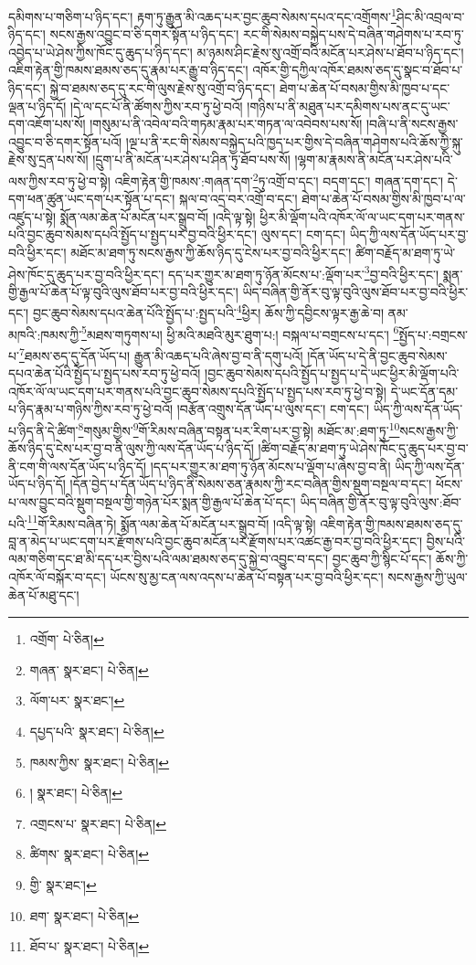 དམིགས་པ་གཅིག་པ་ཉིད་དང་། རྟག་ཏུ་རྒྱུན་མི་འཆད་པར་བྱང་ཆུབ་སེམས་དཔའ་དང་འགྲོགས་\footnote{འགྲོག་  པེ་ཅིན། }ཤིང་མི་འབྲལ་བ་ཉིད་དང་། སངས་རྒྱས་འབྱུང་བ་ཅི་དགར་སྟོན་པ་ཉིད་དང་། རང་གི་སེམས་བསྐྱེད་པས་དེ་བཞིན་གཤེགས་པ་རབ་ཏུ་འབྱེད་པ་ཡེ་ཤེས་ཀྱིས་ཁོང་དུ་ཆུད་པ་ཉིད་དང་། མ་ཉམས་ཤིང་རྗེས་སུ་འགྲོ་བའི་མངོན་པར་ཤེས་པ་ཐོབ་པ་ཉིད་དང་། འཇིག་རྟེན་གྱི་ཁམས་ཐམས་ཅད་དུ་རྣམ་པར་རྒྱུ་བ་ཉིད་དང་། འཁོར་གྱི་དཀྱིལ་འཁོར་ཐམས་ཅད་དུ་སྣང་བ་ཐོབ་པ་ཉིད་དང་། སྐྱེ་བ་ཐམས་ཅད་དུ་རང་གི་ལུས་རྗེས་སུ་འགྲོ་བ་ཉིད་དང་། ཐེག་པ་ཆེན་པོ་བསམ་གྱིས་མི་ཁྱབ་པ་དང་ལྡན་པ་ཉིད་དོ། །དེ་ལ་དང་པོ་ནི་ཚོགས་ཀྱིས་རབ་ཏུ་ཕྱེ་བའོ། །གཉིས་པ་ནི་མཐུན་པར་དམིགས་པས་ནང་དུ་ཡང་དག་འཇོག་པས་སོ། །གསུམ་པ་ནི་འབེལ་བའི་གཏམ་རྣམ་པར་གཏན་ལ་འབེབས་པས་སོ། །བཞི་པ་ནི་སངས་རྒྱས་འབྱུང་བ་ཅི་དགར་སྟོན་པའོ། །ལྔ་པ་ནི་རང་གི་སེམས་བསྐྱེད་པའི་ཁྱད་པར་གྱིས་དེ་བཞིན་གཤེགས་པའི་ཆོས་ཀྱི་སྐུ་རྗེས་སུ་དྲན་པས་སོ། །དྲུག་པ་ནི་མངོན་པར་ཤེས་པ་ཤིན་ཏུ་ཐོབ་པས་སོ། །ལྷག་མ་རྣམས་ནི་མངོན་པར་ཤེས་པའི་ལས་ཀྱིས་རབ་ཏུ་ཕྱེ་བ་སྟེ། འཇིག་རྟེན་གྱི་ཁམས་:གཞན་དག་\footnote{གཞན་  སྣར་ཐང་།  པེ་ཅིན། }ཏུ་འགྲོ་བ་དང་། བདག་དང་། གཞན་དག་དང་། དེ་དག་ཕན་ཚུན་ཡང་དག་པར་སྟོན་པ་དང་། སྐལ་བ་འདྲ་བར་འགྲོ་བ་དང་། ཐེག་པ་ཆེན་པོ་བསམ་གྱིས་མི་ཁྱབ་པ་ལ་འཛུད་པ་སྟེ། སྨོན་ལམ་ཆེན་པོ་མངོན་པར་སྒྲུབ་བོ། །འདི་ལྟ་སྟེ། ཕྱིར་མི་ལྡོག་པའི་འཁོར་ལོ་ལ་ཡང་དག་པར་གནས་པའི་བྱང་ཆུབ་སེམས་དཔའི་སྤྱོད་པ་སྤྱད་པར་བྱ་བའི་ཕྱིར་དང་། ལུས་དང་། ངག་དང་། ཡིད་ཀྱི་ལས་དོན་ཡོད་པར་བྱ་བའི་ཕྱིར་དང་། མཐོང་མ་ཐག་ཏུ་སངས་རྒྱས་ཀྱི་ཆོས་ཉིད་དུ་ངེས་པར་བྱ་བའི་ཕྱིར་དང་། ཚིག་བརྗོད་མ་ཐག་ཏུ་ཡེ་ཤེས་ཁོང་དུ་ཆུད་པར་བྱ་བའི་ཕྱིར་དང་། དད་པར་གྱུར་མ་ཐག་ཏུ་ཉོན་མོངས་པ་:ལྡོག་པར་\footnote{ལོག་པར་  སྣར་ཐང་། }བྱ་བའི་ཕྱིར་དང་། སྨན་གྱི་རྒྱལ་པོ་ཆེན་པོ་ལྟ་བུའི་ལུས་ཐོབ་པར་བྱ་བའི་ཕྱིར་དང་། ཡིད་བཞིན་གྱི་ནོར་བུ་ལྟ་བུའི་ལུས་ཐོབ་པར་བྱ་བའི་ཕྱིར་དང་། བྱང་ཆུབ་སེམས་དཔའ་ཆེན་པོའི་སྤྱོད་པ་:སྤྱད་པའི་\footnote{དཔྱད་པའི་  སྣར་ཐང་།  པེ་ཅིན། }ཕྱིར། ཆོས་ཀྱི་དབྱིངས་ལྟར་རྒྱ་ཆེ་བ། ནམ་མཁའི་:ཁམས་ཀྱི་\footnote{ཁམས་ཀྱིས་  སྣར་ཐང་།  པེ་ཅིན། }མཐས་གཏུགས་པ། ཕྱི་མའི་མཐའི་མུར་ཐུག་པ:། བསྐལ་པ་བགྲངས་པ་དང་། \footnote{།    སྣར་ཐང་།  པེ་ཅིན། }སྤྱོད་པ་:བགྲངས་པ་\footnote{འགྲངས་པ་  སྣར་ཐང་།  པེ་ཅིན། }ཐམས་ཅད་དུ་དོན་ཡོད་པ། རྒྱུན་མི་འཆད་པའི་ཞེས་བྱ་བ་ནི་དགུ་པའོ། །དོན་ཡོད་པ་དེ་ནི་བྱང་ཆུབ་སེམས་དཔའ་ཆེན་པོའི་སྤྱོད་པ་སྤྱད་པས་རབ་ཏུ་ཕྱེ་བའོ། །བྱང་ཆུབ་སེམས་དཔའི་སྤྱོད་པ་སྤྱད་པ་དེ་ཡང་ཕྱིར་མི་ལྡོག་པའི་འཁོར་ལོ་ལ་ཡང་དག་པར་གནས་པའི་བྱང་ཆུབ་སེམས་དཔའི་སྤྱོད་པ་སྤྱད་པས་རབ་ཏུ་ཕྱེ་བ་སྟེ། དེ་ཡང་དོན་དམ་པ་ཉིད་རྣམ་པ་གཉིས་ཀྱིས་རབ་ཏུ་ཕྱེ་བའོ། །བརྩོན་འགྲུས་དོན་ཡོད་པ་ལུས་དང་། ངག་དང་། ཡིད་ཀྱི་ལས་དོན་ཡོད་པ་ཉིད་ནི་དེ་ཚིག་\footnote{ཚིགས་  སྣར་ཐང་།  པེ་ཅིན། }གསུམ་གྱིས་\footnote{གྱི་  སྣར་ཐང་། }གོ་རིམས་བཞིན་བསྟན་པར་རིག་པར་བྱ་སྟེ། མཐོང་མ་:ཐག་ཏུ་\footnote{ཐག་  སྣར་ཐང་།  པེ་ཅིན། }སངས་རྒྱས་ཀྱི་ཆོས་ཉིད་དུ་ངེས་པར་བྱ་བ་ནི་ལུས་ཀྱི་ལས་དོན་ཡོད་པ་ཉིད་དོ། །ཚིག་བརྗོད་མ་ཐག་ཏུ་ཡེ་ཤེས་ཁོང་དུ་ཆུད་པར་བྱ་བ་ནི་ངག་གི་ལས་དོན་ཡོད་པ་ཉིད་དོ། །དད་པར་གྱུར་མ་ཐག་ཏུ་ཉོན་མོངས་པ་ལྡོག་པ་ཞེས་བྱ་བ་ནི། ཡིད་ཀྱི་ལས་དོན་ཡོད་པ་ཉིད་དོ། །དོན་བྱེད་པ་དོན་ཡོད་པ་ཉིད་ནི་སེམས་ཅན་རྣམས་ཀྱི་རང་བཞིན་གྱིས་སྡུག་བསྔལ་བ་དང་། ཕོངས་པ་ལས་བྱུང་བའི་སྡུག་བསྔལ་གྱི་གཉེན་པོར་སྨན་གྱི་རྒྱལ་པོ་ཆེན་པོ་དང་། ཡིད་བཞིན་གྱི་ནོར་བུ་ལྟ་བུའི་ལུས་:ཐོབ་པའི་\footnote{ཐོབ་པ་  སྣར་ཐང་།  པེ་ཅིན། }གོ་རིམས་བཞིན་ཏེ། སྨོན་ལམ་ཆེན་པོ་མངོན་པར་སྒྲུབ་བོ། །འདི་ལྟ་སྟེ། འཇིག་རྟེན་གྱི་ཁམས་ཐམས་ཅད་དུ་བླ་ན་མེད་པ་ཡང་དག་པར་རྫོགས་པའི་བྱང་ཆུབ་མངོན་པར་རྫོགས་པར་འཚང་རྒྱ་བར་བྱ་བའི་ཕྱིར་དང་། བྱིས་པའི་ལམ་གཅིག་དང་ཐ་མི་དད་པར་བྱིས་པའི་ལམ་ཐམས་ཅད་དུ་སྐྱེ་བ་འབྱུང་བ་དང་། བྱང་ཆུབ་ཀྱི་སྙིང་པོ་དང་། ཆོས་ཀྱི་འཁོར་ལོ་བསྐོར་བ་དང་། ཡོངས་སུ་མྱ་ངན་ལས་འདས་པ་ཆེན་པོ་བསྟན་པར་བྱ་བའི་ཕྱིར་དང་། སངས་རྒྱས་ཀྱི་ཡུལ་ཆེན་པོ་མཐུ་དང་། 